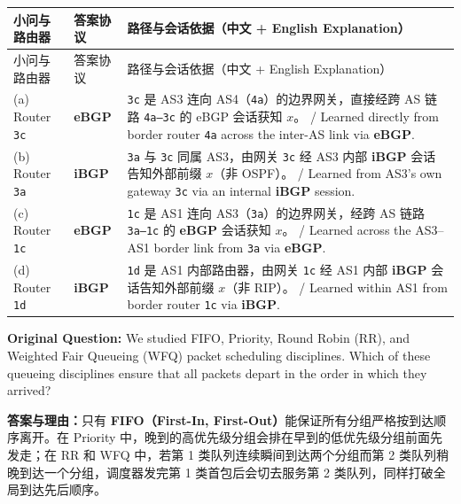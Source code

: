 \begingroup\small\setlength{\tabcolsep}{3pt}\renewcommand{\arraystretch}{1.20}
\begin{longtable}{@{}>{\raggedright\arraybackslash}p{}>{\raggedright\arraybackslash}p{}>{\raggedright\arraybackslash}p{}@{}}
\toprule
小问与路由器 & 答案协议 & 路径与会话依据（中文 + English Explanation） \\
\midrule\endfirsthead
小问与路由器 & 答案协议 & 路径与会话依据（中文 + English Explanation） \\
\midrule\endhead
\bottomrule\endfoot
(a) Router \texttt{3c} & \textbf{eBGP} & \texttt{3c} 是 AS3 连向 AS4（\texttt{4a}）的边界网关，直接经跨 AS 链路 \texttt{4a–3c} 的 eBGP 会话获知 $x$。 / Learned directly from border router \texttt{4a} across the inter-AS link via \textbf{eBGP}. \\
(b) Router \texttt{3a} & \textbf{iBGP} & \texttt{3a} 与 \texttt{3c} 同属 AS3，由网关 \texttt{3c} 经 AS3 内部 \textbf{iBGP} 会话告知外部前缀 $x$（非 OSPF）。 / Learned from AS3's own gateway \texttt{3c} via an internal \textbf{iBGP} session. \\
(c) Router \texttt{1c} & \textbf{eBGP} & \texttt{1c} 是 AS1 连向 AS3（\texttt{3a}）的边界网关，经跨 AS 链路 \texttt{3a–1c} 的 \textbf{eBGP} 会话获知 $x$。 / Learned across the AS3–AS1 border link from \texttt{3a} via \textbf{eBGP}. \\
(d) Router \texttt{1d} & \textbf{iBGP} & \texttt{1d} 是 AS1 内部路由器，由网关 \texttt{1c} 经 AS1 内部 \textbf{iBGP} 会话告知外部前缀 $x$（非 RIP）。 / Learned within AS1 from border router \texttt{1c} via \textbf{iBGP}. \\
\end{longtable}\endgroup



\textbf{Original Question:} We studied FIFO, Priority, Round Robin (RR), and Weighted Fair Queueing (WFQ) packet scheduling disciplines. Which of these queueing disciplines ensure that all packets depart in the order in which they arrived?

\textbf{答案与理由：}只有 \textbf{FIFO（First-In, First-Out）}能保证所有分组严格按到达顺序离开。在 Priority 中，晚到的高优先级分组会排在早到的低优先级分组前面先发走；在 RR 和 WFQ 中，若第 1 类队列连续瞬间到达两个分组而第 2 类队列稍晚到达一个分组，调度器发完第 1 类首包后会切去服务第 2 类队列，同样打破全局到达先后顺序。

